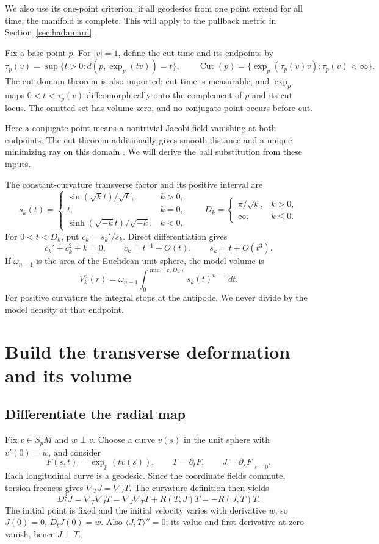 \documentclass[12pt,reqno]{amsart}
\begin{document}
We also use its one-point criterion: if all geodesics from one point extend for all time, the manifold is complete. This will apply to the pullback metric in Section~\ref{sec:hadamard}.

Fix a base point \(p\). For \(|v|=1\), define the cut time and its endpoints by
\[
\tau_p(v)=\sup\{t>0:d(p,\exp_p(tv))=t\},
\qquad \operatorname{Cut}(p)=\{\exp_p(\tau_p(v)v):\tau_p(v)<\infty\}.
\]
The cut-domain theorem is also imported: cut time is measurable, and \(\exp_p\) maps \(0<t<\tau_p(v)\) diffeomorphically onto the complement of \(p\) and its cut locus. The omitted set has volume zero, and no conjugate point occurs before cut.

Here a conjugate point means a nontrivial Jacobi field vanishing at both endpoints. The cut theorem additionally gives smooth distance and a unique minimizing ray on this domain \cite[Section 5]{S-Eschenburg-1994}. We will derive the ball substitution from these inputs.

The constant-curvature transverse factor and its positive interval are
\[
s_k(t)=\begin{cases}
\sin(\sqrt{k}t)/\sqrt{k},&k>0,\\t,&k=0,\\
\sinh(\sqrt{-k}t)/\sqrt{-k},&k<0,
\end{cases}
\qquad
D_k=\begin{cases}\pi/\sqrt{k},&k>0,\\\infty,&k\le0.\end{cases}
\]
For \(0<t<D_k\), put \(c_k=s_k'/s_k\). Direct differentiation gives
\[
c_k'+c_k^2+k=0,\qquad c_k=t^{-1}+O(t),\qquad s_k=t+O(t^3).
\]
If \(\omega_{n-1}\) is the area of the Euclidean unit sphere, the model volume is
\[
V_k^n(r)=\omega_{n-1}\int_0^{\min(r,D_k)}s_k(t)^{n-1}\,dt.
\]
For positive curvature the integral stops at the antipode. We never divide by the model density at that endpoint.

\section{Build the transverse deformation and its volume}
\label{sec:jacobi}

\subsection{Differentiate the radial map}
Fix \(v\in S_pM\) and \(w\perp v\). Choose a curve \(v(s)\) in the unit sphere with \(v'(0)=w\), and consider
\[
F(s,t)=\exp_p(tv(s)),\qquad T=\partial_tF,\qquad J=\partial_sF\big|_{s=0}.
\]
Each longitudinal curve is a geodesic. Since the coordinate fields commute, torsion freeness gives \(\nabla_TJ=\nabla_JT\). The curvature definition then yields
\[
D_t^2J=\nabla_T\nabla_JT
=\nabla_J\nabla_TT+R(T,J)T=-R(J,T)T.
\]
The initial point is fixed and the initial velocity varies with derivative \(w\), so \(J(0)=0\), \(D_tJ(0)=w\). Also \(\langle J,T\rangle''=0\); its value and first derivative at zero vanish, hence \(J\perp T\).
\end{document}
